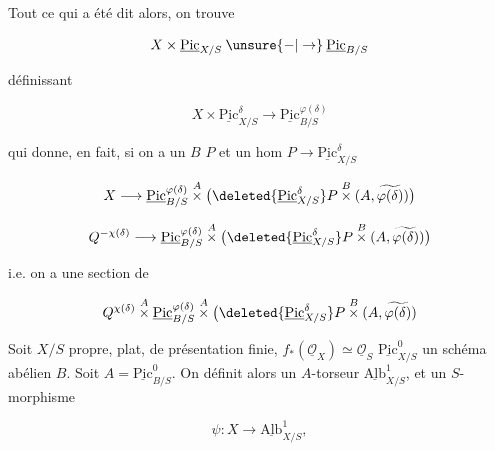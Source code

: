 Tout ce qui a été dit  alors, on trouve

\[
X\times\underline{\mathrm{Pic}}_{X/S}\mathbin{\unsure{-|\to}}\underline{\mathrm{Pic}}_{B/S}
\]

définissant

\[
X\times\underline{\mathrm{Pic}}^\delta_{X/S}\longrightarrow\underline{\mathrm{Pic}}^{\varphi(\delta)}_{B/S}
\]


qui donne, en fait, si on a un $B$ $P$ et un hom $P\longrightarrow\underline{\mathrm{Pic}}^\delta_{X/S}$ 

\[
X\longrightarrow\underline{\mathrm{Pic}}^{\varphi(\delta)}_{B/S}\overset{A}{\times}\bigl(\deleted{\underline{\mathrm{Pic}}_{X/S}^{\delta}}P\overset{B}{\times}(A,\widetilde{\varphi(\delta)})\bigr)
\]


\[
Q^{-\chi(\delta)}\longrightarrow\underline{\mathrm{Pic}}^{\varphi(\delta)}_{B/S}\overset{A}{\times}\bigl(\deleted{\underline{\mathrm{Pic}}^\delta_{X/S}}P\overset{B}{\times}(A,\widetilde{\varphi(\delta)})\bigr)
\]

i.e. on a une section de

\[
Q^{\chi(\delta)}\overset{A}{\times}\underline{\mathrm{Pic}}^{\varphi(\delta)}_{B/S}\overset{A}{\times}\bigl(\deleted{\underline{\mathrm{Pic}}^\delta_{X/S}}P\overset{B}{\times}(A,\widetilde{\varphi(\delta)})
\]

   

Soit $X/S$ propre, plat, de présentation finie, $f_*(\underline{\mathcal O}_X)\simeq\underline{\mathcal O}_S$  $\underline{\mathrm{Pic}}^0_{X/S}$ un schéma abélien $B$. Soit $A=\underline{\mathrm{Pic}}^0_{B/S}$. On définit alors un  $A$-torseur $\underline{\mathrm{Alb}}^1_{X/S}$, et un $S$-morphisme

\[
\psi\colon X\longrightarrow\underline{\mathrm{Alb}}^1_{X/S},
\]

